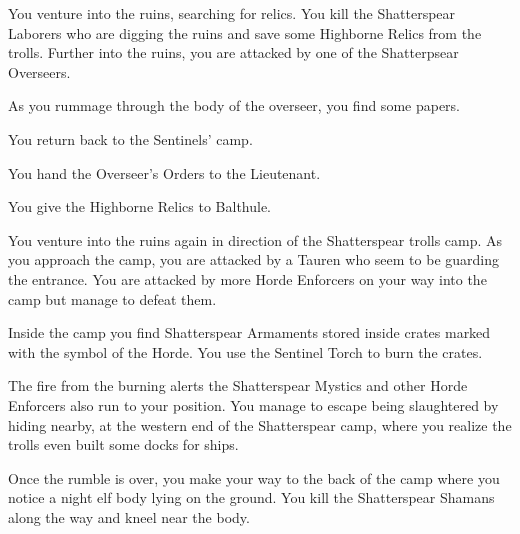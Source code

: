 


You venture into the ruins, searching for relics. You kill the Shatterspear Laborers who are digging the ruins and save some Highborne Relics from the trolls. Further into the ruins, you are attacked by one of the Shatterpsear Overseers.


As you rummage through the body of the overseer, you find some papers.


You return back to the Sentinels' camp.


You hand the Overseer's Orders to the Lieutenant.




You give the Highborne Relics to Balthule.





You venture into the ruins again in direction of the Shatterspear trolls camp. As you approach the camp, you are attacked by a Tauren who seem to be guarding the entrance. You are attacked by more Horde Enforcers on your way into the camp but manage to defeat them.

Inside the camp you find Shatterspear Armaments stored inside crates marked with the symbol of the Horde. You use the Sentinel Torch to burn the crates.

The fire from the burning alerts the Shatterspear Mystics and other Horde Enforcers also run to your position. You manage to escape being slaughtered by hiding nearby, at the western end of the Shatterspear camp, where you realize the trolls even built some docks for ships.

Once the rumble is over, you make your way to the back of the camp where you notice a night elf body lying on the ground. You kill the Shatterspear Shamans along the way and kneel near the body.

